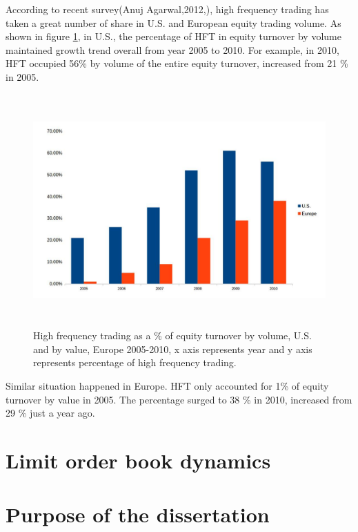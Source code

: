 According to recent survey(Anuj Agarwal,2012,\cite{hft_future}), high frequency trading has taken a great number of share in U.S. and European equity trading volume. As shown in figure \ref{fig.1}, in U.S., the percentage of HFT in equity turnover by volume maintained growth trend overall from year 2005 to 2010. For example, in 2010, HFT occupied 56\% by volume of the entire equity turnover, increased from 21 \% in 2005. 

\begin{figure}[hbtp]
  \begin{center}
    \includegraphics[width=6.5in,height=3.5in]{figures/hft_percentage.jpg}
  \end{center}
\caption{High frequency trading as a \% of equity turnover by volume, U.S. and by value, Europe 2005-2010, x axis represents year and y axis represents percentage of high frequency trading.} \label{fig.1}
\end{figure}

Similar situation happened in Europe. HFT only accounted for 1\% of equity turnover by value in 2005. The percentage surged to 38 \% in 2010, increased from 29 \% just a year ago.

\section{Limit order book dynamics}

\section{Purpose of the dissertation}